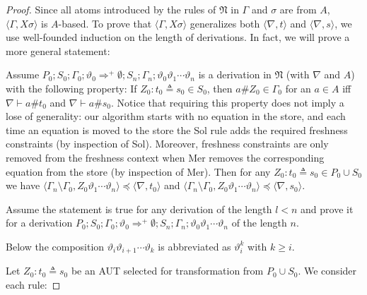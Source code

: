 \documentclass[11pt,a4paper]{amsart}
\theoremstyle{definition}
\newcommand{\Lra}{\Longrightarrow}
\newcommand{\frN}{\mathfrak N}
\newcommand{\np}[2]{\langle #1, \allowbreak #2\rangle}
\newcommand{\Atoms}{A}
\newcommand{\nablai}{{\nabla}}
\newcommand{\nablag}{\Gamma}
\begin{document}
\begin{proof} Since all atoms introduced by the rules
    of $\frN$ in $\nablag$ and $\sigma$ are from $\Atoms$,
    $\np{\nablag}{X\sigma}$ is $\Atoms$-based. To prove that
    $\np{\nablag}{X\sigma}$ generalizes both $\np{\nablai}{t}$ and
    $\np{\nablai}{s}$, we use well-founded induction on the length of
    derivations. In fact, we will prove a more general statement:

    Assume $P_0;S_0;\Gamma_0;\vartheta_0 \Lra^+ \emptyset;
    S_n;\Gamma_n;\vartheta_0\vartheta_1\cdots\vartheta_n$ is a
    derivation in $\frN$ (with $\nabla$ and $\Atoms$) with
      the following property: If $Z_0:t_0\triangleq s_0\in S_0$, then
      $a\# Z_0\in \nablag_0$ for an $a\in \Atoms$ iff $\nabla\vdash
      a\#t_0$ and $\nabla\vdash a\#s_0$. Notice that
      requiring this property does not imply a lose of generality: our
      algorithm starts with no equation in the store, and each time an
      equation is moved to the store the {\sf Sol} rule adds the
      required freshness constraints (by inspection of {\sf
        Sol}). Moreover, freshness constraints are only removed from
      the freshness context when {\sf Mer} removes the corresponding
      equation from the store (by inspection of {\sf Mer}).  Then for
    any $Z_0:t_0 \triangleq s_0\in P_0\cup S_0$ we have
    $\np{\Gamma_n\setminus \Gamma_0}{Z_0 \vartheta_1\cdots\vartheta_n}
    \preceq \np{\nabla}{t_0}$ and $\np{\Gamma_n\setminus \Gamma_0}{Z_0
      \vartheta_1\cdots\vartheta_n} \preceq \np{\nabla}{s_0}$.

Assume the statement is true for any derivation of the length $l < n$
and prove it for a derivation $P_0;S_0;\Gamma_0;\vartheta_0 \Lra^+
\emptyset; S_n;\Gamma_n;\vartheta_0\vartheta_1\cdots\vartheta_n$ of
the length $n$. 

Below the composition $\vartheta_i\vartheta_{i+1}\cdots\vartheta_k$ is abbreviated as $\vartheta_i^k$ with $ k\ge i$. 

Let $Z_0: t_0 \triangleq s_0$ be an AUT selected for transformation from $P_0\cup S_0$.  We consider each rule:\vspace{0.3cm}


\end{proof}
\end{document}
